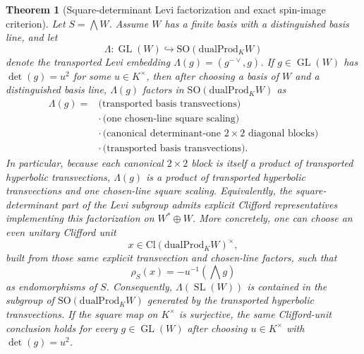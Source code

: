 \documentclass[11pt,a4paper]{article}
\theoremstyle{plain}
\newtheorem{theorem}{Theorem}[section]
\theoremstyle{definition}
\theoremstyle{remark}
\newcommand{\Cl}{\mathrm{Cl}}
\newcommand{\SO}{\mathrm{SO}}
\newcommand{\dualProd}{\mathrm{dualProd}}
\begin{document}
\begin{theorem}[Square-determinant Levi factorization and exact spin-image criterion]
\label{thm:square-det-levi}
Let $S=\bigwedge W$. Assume $W$ has a finite basis with a distinguished basis
line, and let
\[
  \Lambda:\operatorname{GL}(W)\hookrightarrow \SO(\dualProd_K W)
\]
denote the transported Levi embedding $\Lambda(g)=(g^{-{\vee}},g)$. If
$g\in \operatorname{GL}(W)$ has $\det(g)=u^2$ for some $u\in K^\times$, then
after choosing a basis of $W$ and a distinguished basis line, $\Lambda(g)$
factors in
$\SO(\dualProd_K W)$ as
\[
  \begin{aligned}
  \Lambda(g) ={}&
    \text{(transported basis transvections)} \\
    &\cdot\, \text{(one chosen-line square scaling)} \\
    &\cdot\, \text{(canonical determinant-one $2\times 2$ diagonal blocks)} \\
    &\cdot\, \text{(transported basis transvections)}.
  \end{aligned}
\]
In particular, because each canonical $2\times2$ block is itself a product of
transported hyperbolic transvections, $\Lambda(g)$ is a product of transported
hyperbolic transvections and one chosen-line square scaling. Equivalently, the
square-determinant part of the Levi subgroup admits explicit Clifford
representatives implementing this factorization on $W^*\oplus W$. More
concretely,
one can choose an even unitary Clifford unit
\[
  x\in \Cl(\dualProd_K W)^\times,
\]
built from those same explicit transvection and chosen-line factors, such that
\[
  \rho_S(x)=-u^{-1}(\bigwedge g)
\]
as endomorphisms of $S$. Consequently, $\Lambda(\operatorname{SL}(W))$ is
contained in the subgroup of
$\SO(\dualProd_K W)$ generated by the transported hyperbolic transvections.
If the square map on $K^\times$ is surjective, the same Clifford-unit conclusion
holds for every $g\in\operatorname{GL}(W)$ after choosing
$u\in K^\times$ with $\det(g)=u^2$.


\end{theorem}
\end{document}
